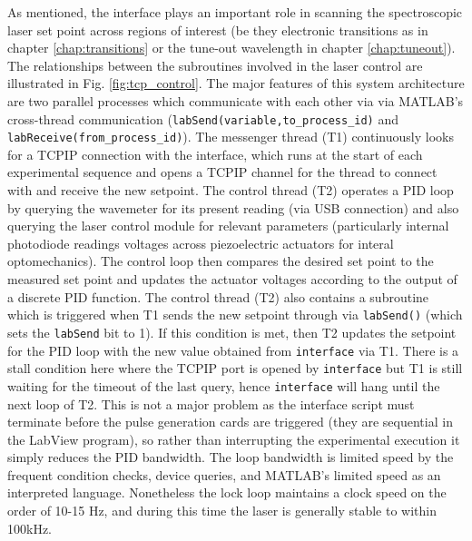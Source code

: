 	As mentioned, the interface plays an important role in scanning the spectroscopic laser set point across regions of interest (be they electronic transitions as in chapter \ref{chap:transitions} or the tune-out wavelength in chapter \ref{chap:tuneout}). 
	The relationships between the subroutines involved in the laser control are illustrated in Fig. \ref{fig:tcp_control}.
	The major features of this system architecture are two parallel processes which communicate with each other via via MATLAB's cross-thread communication (\verb|labSend(variable,to_process_id)| and \verb|labReceive(from_process_id)|).
	The messenger thread (T1) continuously looks for a TCPIP connection with the interface, which runs at the start of each experimental sequence and opens a TCPIP channel for the thread to connect with and receive the new setpoint.
	The control thread (T2) operates a PID loop by querying the wavemeter for its present reading (via USB connection) and also querying the laser control module for relevant parameters (particularly internal photodiode readings voltages across piezoelectric actuators for interal optomechanics).
	The control loop then compares the desired set point to the measured set point and updates the actuator voltages according to the output of a discrete PID function.
	The control thread (T2) also contains a subroutine which is triggered when T1 sends the new setpoint through via \verb|labSend()| (which sets the \verb|labSend| bit to 1).
	If this condition is met, then T2 updates the setpoint for the PID loop with the new value obtained from \verb|interface| via T1.
	There is a stall condition here where the TCPIP port is opened by \verb|interface| but T1 is still waiting for the timeout of the last query, hence \verb|interface| will hang until the next loop of T2.
	This is not a major problem as the interface script must terminate before the pulse generation cards are triggered (they are sequential in the LabView program), so rather than interrupting the experimental execution it simply reduces the PID bandwidth.
	The loop bandwidth is limited speed by the frequent condition checks, device queries, and MATLAB's limited speed as an interpreted language. 
	Nonetheless the lock loop maintains a clock speed on the order of 10-15 Hz, and during this time the laser is generally stable to within 100kHz.

